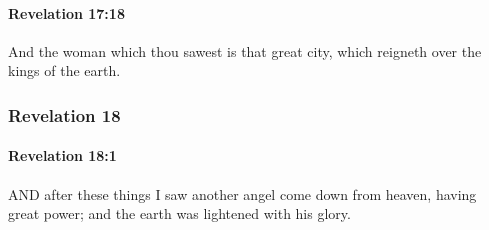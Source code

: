 		\paragraph{Revelation 17:18} %
			\label{REVELATIONNT-17-18}

			And the woman which thou sawest is that great city, which reigneth over the kings of the earth.

			\begin{framed}
			\scriptsize
				\begin{compactdesc}
					\item[SBLG] 
				\end{compactdesc}
			\end{framed}

	\subsubsection{Revelation 18} %
		\label{REVELATIONNT-18}
		
		\paragraph{Revelation 18:1} %
			\label{REVELATIONNT-18-1}

			AND after these things I saw another angel come down from heaven, having great power; and the earth was lightened with his glory.

